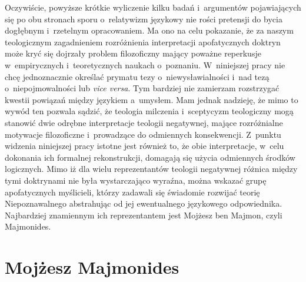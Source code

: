 Oczywiście, powyższe krótkie wyliczenie kilku badań i~argumentów pojawiających się po obu stronach sporu o~relatywizm językowy nie rości pretensji do bycia dogłębnym i~rzetelnym opracowaniem. Ma ono na celu pokazanie, że za naszym teologicznym zagadnieniem rozróżnienia interpretacji apofatycznych doktryn może kryć się dojrzały problem filozoficzny mający poważne reperkusje w~empirycznych i~teoretycznych naukach o~poznaniu. W~niniejszej pracy nie chcę jednoznacznie określać prymatu tezy o~niewysławialności i~nad tezą o~niepojmowalności lub \textit{vice versa}. Tym bardziej nie zamierzam rozstrzygać kwestii powiązań między językiem a~umysłem. Mam jednak nadzieję, że mimo to wywód ten pozwala sądzić, że teologia milczenia i~sceptycyzm teologiczny mogą stanowić dwie odrębne interpretacje teologii negatywnej, mające rozróżnialne motywacje filozoficzne i~prowadzące do odmiennych konsekwencji. Z~punktu widzenia niniejszej pracy istotne jest również to, że obie interpretacje, w~celu dokonania ich formalnej rekonstrukcji, domagają się użycia odmiennych środków logicznych. Mimo iż dla wielu reprezentantów teologii negatywnej różnica między tymi doktrynami nie była wystarczająco wyraźna, można wskazać grupę apofatycznych myślicieli, którzy zadawali się świadomie rozwijać teorię Niepoznawalnego abstrahując od jej ewentualnego językowego odpowiednika. Najbardziej znamiennym ich reprezentantem jest Mojżesz ben Majmon, czyli Majmonides.

\section{Mojżesz Majmonides}

